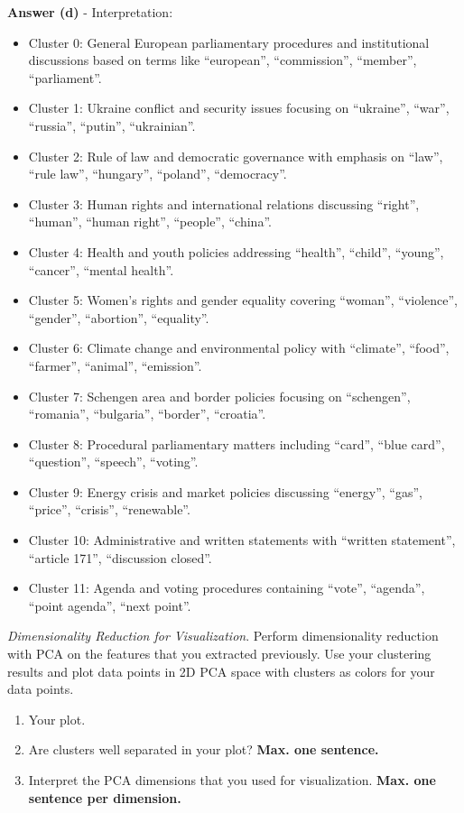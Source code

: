 \documentclass[a4paper,10pt]{article}
\begin{document}
\begin{enumerate}[topsep=0mm, partopsep=0mm, leftmargin=*]
\textbf{Answer (d)} - Interpretation:
\begin{itemize}
	\item Cluster 0: General European parliamentary procedures and institutional discussions based on terms like ``european'', ``commission'', ``member'', ``parliament''.
	\item Cluster 1: Ukraine conflict and security issues focusing on ``ukraine'', ``war'', ``russia'', ``putin'', ``ukrainian''.
	\item Cluster 2: Rule of law and democratic governance with emphasis on ``law'', ``rule law'', ``hungary'', ``poland'', ``democracy''.
	\item Cluster 3: Human rights and international relations discussing ``right'', ``human'', ``human right'', ``people'', ``china''.
	\item Cluster 4: Health and youth policies addressing ``health'', ``child'', ``young'', ``cancer'', ``mental health''.
	\item Cluster 5: Women's rights and gender equality covering ``woman'', ``violence'', ``gender'', ``abortion'', ``equality''.
	\item Cluster 6: Climate change and environmental policy with ``climate'', ``food'', ``farmer'', ``animal'', ``emission''.
	\item Cluster 7: Schengen area and border policies focusing on ``schengen'', ``romania'', ``bulgaria'', ``border'', ``croatia''.
	\item Cluster 8: Procedural parliamentary matters including ``card'', ``blue card'', ``question'', ``speech'', ``voting''.
	\item Cluster 9: Energy crisis and market policies discussing ``energy'', ``gas'', ``price'', ``crisis'', ``renewable''.
	\item Cluster 10: Administrative and written statements with ``written statement'', ``article 171'', ``discussion closed''.
	\item Cluster 11: Agenda and voting procedures containing ``vote'', ``agenda'', ``point agenda'', ``next point''.
\end{itemize}



\clearpage
{\color{blue}
\newpage\item\textit{Dimensionality Reduction for Visualization}. Perform dimensionality reduction with PCA on the features that you extracted previously. Use your clustering results and plot data points in 2D PCA space with clusters as colors for your data points.
\begin{enumerate}
	\item Your plot.
	\item Are clusters well separated in your plot? {\color{red}\textbf{Max. one sentence.}}
	\item Interpret the PCA dimensions that you used for visualization. {\color{red}\textbf{Max. one sentence per dimension.}}
\end{enumerate}
}


\end{enumerate}
\end{document}
